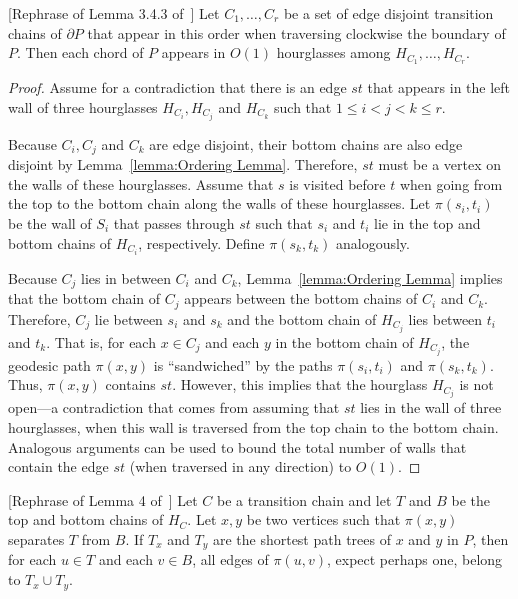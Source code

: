 \documentclass[a4paper,UKenglish]{lipics}
\newcommand{\p}[2]{\ensuremath{\pi(#1, #2)}}
\begin{document}
\begin{lemma}\label{lemma:Edges appear a constant number of times}
[Rephrase of Lemma 3.4.3 of~\cite{aronov1993furthest}]
Let $C_1, \ldots, C_r$ be a set of edge disjoint transition chains of $\partial P$ that appear in this order when traversing clockwise the boundary of $P$. Then each chord of $P$ appears in $O(1)$ hourglasses among $H_{C_1}, \ldots, H_{C_r}$.
\end{lemma}
\begin{proof}
Assume for a contradiction that there is an edge $st$ that appears in the left wall of three hourglasses $H_{C_i}, H_{C_j}$ and $H_{C_k}$ such that $1\leq i < j < k\leq r$. 

Because $C_i,C_j$ and $C_k$ are edge disjoint, their bottom chains are also edge disjoint by Lemma~\ref{lemma:Ordering Lemma}. 
Therefore, $st$ must be a vertex on the walls of these hourglasses. 
Assume that $s$ is visited before $t$ when going from the top to the bottom chain along the walls of these hourglasses. 
Let $\p{s_i}{t_i}$ be the wall of $S_i$ that passes through $st$ such that $s_i$ and $t_i$ lie in the top and bottom chains of $H_{C_i}$, respectively. Define $\p{s_k}{t_k}$ analogously.

Because  $C_j$ lies in between $C_i$ and $C_k$, Lemma~\ref{lemma:Ordering Lemma} implies that the bottom chain of $C_j$ appears between the bottom chains of $C_i$ and $C_k$. Therefore, $C_j$ lie between $s_i$ and $s_k$ and the bottom chain of $H_{C_j}$ lies between $t_i$ and $t_k$. 
That is, for each $x\in C_j$ and each $y$ in the bottom chain of $H_{C_j}$, the geodesic path $\p{x}{y}$ is ``sandwiched'' by the paths $\p{s_i}{t_i}$ and $\p{s_k}{t_k}$.
Thus, $\p{x}{y}$ contains $st$.
However, this implies that the hourglass $H_{C_j}$ is not open---a contradiction that comes from assuming that $st$ lies in the  wall of three hourglasses, when this wall is traversed from the top chain to the bottom chain. 
Analogous arguments can be used to bound the total number of walls that contain the edge $st$ (when traversed in any direction) to $O(1)$.
\end{proof}

\begin{lemma}\label{lemma:Suri's lemma}
[Rephrase of Lemma 4 of~\cite{suri1989computing}]
Let $C$ be a transition chain and let $T$ and $B$ be the top and bottom chains of $H_C$.
Let $x,y$ be two vertices such that $\p{x}{y}$ separates $T$ from $B$. 
If $T_x$ and $T_y$ are the shortest path trees of $x$ and $y$ in $P$, then for each $u\in T$ and each $v\in B$, all edges of $\p{u}{v}$, expect perhaps one, belong to $T_x\cup T_y$.
\end{lemma}
\end{document}
